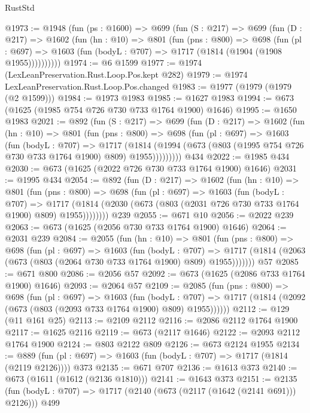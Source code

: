\begin{lexlean}{RustStd}
\begin{coremodule}
{\begin{coremodule}
{{{{{{{{{{@1973 := @1948
    (fun (ps : @1600) =>
    @699
      (fun (S : @217) =>
      @699
        (fun (D : @217) =>
        @1602
          (fun (hn : @10) =>
          @801
            (fun (pns : @800) =>
            @698
              (fun (pl : @697) =>
              @1603 (fun (bodyL : @707) => @1717 (@1814 (@1904 (@1908 @1955))))))))))
@1974 := @6 @1599
@1977 := @1974 (LexLeanPreservation.Rust.Loop.Pos.kept @282)
@1979 := @1974 LexLeanPreservation.Rust.Loop.Pos.changed
@1983 := @1977 (@1979 (@1979 (@2 @1599)))
@1984 := @1973 @1983
@1985 := @1627 @1983
@1994 := @673 (@1625 (@1985 @754 @726 @730 @733 @1764 @1900) @1646)
@1995 := @1650 @1983
@2021 := @892
    (fun (S : @217) =>
    @699
      (fun (D : @217) =>
      @1602
        (fun (hn : @10) =>
        @801
          (fun (pns : @800) =>
          @698
            (fun (pl : @697) =>
            @1603
              (fun (bodyL : @707) =>
              @1717
                (@1814
                  (@1994 (@673 (@803 (@1995 @754 @726 @730 @733 @1764 @1900) @809) @1955)))))))))
    @434
@2022 := @1985 @434
@2030 := @673 (@1625 (@2022 @726 @730 @733 @1764 @1900) @1646)
@2031 := @1995 @434
@2054 := @892
    (fun (D : @217) =>
    @1602
      (fun (hn : @10) =>
      @801
        (fun (pns : @800) =>
        @698
          (fun (pl : @697) =>
          @1603
            (fun (bodyL : @707) =>
            @1717 (@1814 (@2030 (@673 (@803 (@2031 @726 @730 @733 @1764 @1900) @809) @1955))))))))
    @239
@2055 := @671 @10
@2056 := @2022 @239
@2063 := @673 (@1625 (@2056 @730 @733 @1764 @1900) @1646)
@2064 := @2031 @239
@2084 := @2055
    (fun (hn : @10) =>
    @801
      (fun (pns : @800) =>
      @698
        (fun (pl : @697) =>
        @1603
          (fun (bodyL : @707) =>
          @1717 (@1814 (@2063 (@673 (@803 (@2064 @730 @733 @1764 @1900) @809) @1955)))))))
    @57
@2085 := @671 @800
@2086 := @2056 @57
@2092 := @673 (@1625 (@2086 @733 @1764 @1900) @1646)
@2093 := @2064 @57
@2109 := @2085
    (fun (pns : @800) =>
    @698
      (fun (pl : @697) =>
      @1603
        (fun (bodyL : @707) =>
        @1717 (@1814 (@2092 (@673 (@803 (@2093 @733 @1764 @1900) @809) @1955))))))
@2112 := @129 (@11 @161 @25)
@2113 := @2109 @2112
@2116 := @2086 @2112 @1764 @1900
@2117 := @1625 @2116
@2119 := @673 (@2117 @1646)
@2122 := @2093 @2112 @1764 @1900
@2124 := @803 @2122 @809
@2126 := @673 @2124 @1955
@2134 := @889 (fun (pl : @697) => @1603 (fun (bodyL : @707) => @1717 (@1814 (@2119 @2126)))) @373
@2135 := @671 @707
@2136 := @1613 @373
@2140 := @673 (@1611 (@1612 (@2136 @1810)))
@2141 := @1643 @373
@2151 := @2135 (fun (bodyL : @707) => @1717 (@2140 (@673 (@2117 (@1642 (@2141 @691))) @2126))) @499
}}}}}}}}}}
\end{coremodule}}
\end{coremodule}
\end{lexlean}
